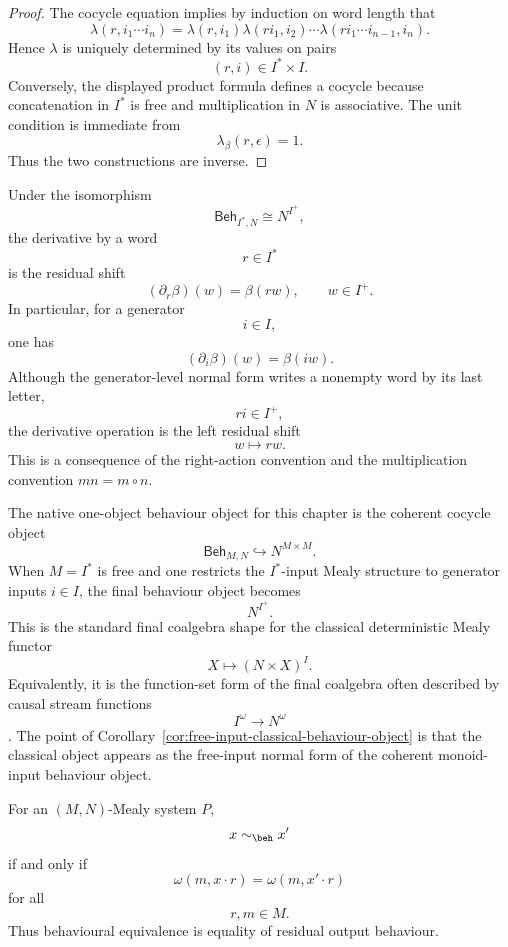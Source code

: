 \begin{proof}
The cocycle equation implies by induction on word length that
\[
\lambda(r,i_1\cdots i_n)
=
\lambda(r,i_1)
\lambda(ri_1,i_2)
\cdots
\lambda(ri_1\cdots i_{n-1},i_n).
\]
Hence \(\lambda\) is uniquely determined by its values on pairs
\[
(r,i)\in I^\ast\times I.
\]
Conversely, the displayed product formula defines a cocycle because
concatenation in \(I^\ast\) is free and multiplication in \(N\) is
associative. The unit condition is immediate from
\[
\lambda_\beta(r,\epsilon)=1.
\]
Thus the two constructions are inverse.
\end{proof}

\begin{corollary}
\label{cor:free-input-derivatives-classical-normal-form}
Under the isomorphism
\[
\mathsf{Beh}_{I^\ast,N}\cong N^{I^+},
\]
the derivative by a word
\[
r\in I^\ast
\]
is the residual shift
\[
(\partial_r\beta)(w)=\beta(rw),
\qquad
w\in I^+.
\]
In particular, for a generator
\[
i\in I,
\]
one has
\[
(\partial_i\beta)(w)=\beta(iw).
\]
Although the generator-level normal form writes a nonempty word by its last
letter,
\[
ri\in I^+,
\]
the derivative operation is the left residual shift
\[
w\longmapsto rw.
\]
This is a consequence of the right-action convention and the multiplication
convention \(mn=m\circ n\).
\end{corollary}

\begin{remark}
\label{rem:agreement-standard-final-mealy-coalgebra}
The native one-object behaviour object for this chapter is the coherent
cocycle object
\[
\mathsf{Beh}_{M,N}
\hookrightarrow
N^{M\times M}.
\]
When \(M=I^\ast\) is free and one restricts the \(I^\ast\)-input Mealy
structure to generator inputs \(i\in I\), the final behaviour object becomes
\[
N^{I^+}.
\]
This is the standard final coalgebra shape for the classical deterministic
Mealy functor
\[
X\mapsto (N\times X)^I.
\]
Equivalently, it is the function-set form of the final coalgebra often
described by causal stream functions
\[
I^\omega\to N^\omega
\]
\cite{RuttenUniversalCoalgebra,SilvaCoalgebraicAutomata,PattinsonCoalgebraNotes}.
The point of Corollary~\ref{cor:free-input-classical-behaviour-object} is that
the classical object appears as the free-input normal form of the coherent
monoid-input behaviour object.
\end{remark}

\begin{example}
\label{ex:monoid-behavioural-equivalence}
For an \((M,N)\)-Mealy system \(P\),
\[
x\sim_{\beh}x'
\]
if and only if
\[
\omega(m,x\cdot r)=\omega(m,x'\cdot r)
\]
for all
\[
r,m\in M.
\]
Thus behavioural equivalence is equality of residual output behaviour.
\end{example}

